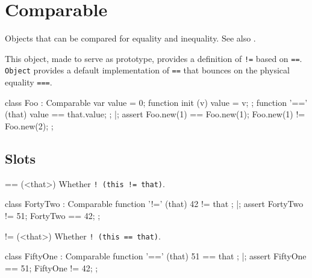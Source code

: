 
\section{Comparable}
Objects that can be compared for equality and inequality.  See also
.

This object, made to serve as prototype, provides a definition of
\lstinline{!=} based on \lstinline{==}.  \lstinline{Object} provides
a default implementation of \lstinline{==} that bounces on the physical
equality \lstinline{===}.

\begin{urbiscript}[firstnumber=1]
class Foo : Comparable
{
  var value = 0;
  function init (v)    { value = v; };
  function '==' (that) { value == that.value; };
}|;
assert
{
  Foo.new(1) == Foo.new(1);
  Foo.new(1) != Foo.new(2);
};
\end{urbiscript}

\subsection{Slots}

\begin{urbiscriptapi}
\item[==](<that>)
  Whether \lstinline|! (this != that)|.
\begin{urbiscript}
class FortyTwo : Comparable
{
  function '!=' (that) { 42 != that };
}|;
assert
{
  FortyTwo != 51;
  FortyTwo == 42;
};
\end{urbiscript}


\item[!=](<that>)
  Whether \lstinline|! (this == that)|.

\begin{urbiscript}
class FiftyOne : Comparable
{
  function '==' (that) { 51 == that };
}|;
assert
{
  FiftyOne == 51;
  FiftyOne != 42;
};
\end{urbiscript}
\end{urbiscriptapi}

